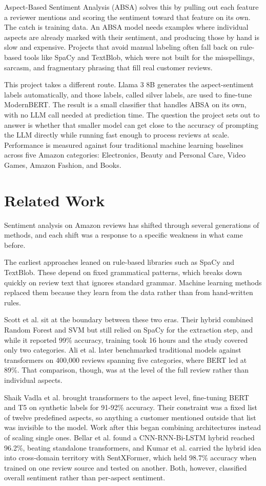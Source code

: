 \documentclass[sigconf]{acmart}
\begin{document}
Aspect-Based Sentiment Analysis (ABSA) solves this by pulling out each feature a reviewer mentions and scoring the sentiment toward that feature on its own. The catch is training data. An ABSA model needs examples where individual aspects are already marked with their sentiment, and producing those by hand is slow and expensive. Projects that avoid manual labeling often fall back on rule-based tools like SpaCy and TextBlob, which were not built for the misspellings, sarcasm, and fragmentary phrasing that fill real customer reviews.

This project takes a different route. Llama 3 8B generates the aspect-sentiment labels automatically, and those labels, called silver labels, are used to fine-tune ModernBERT. The result is a small classifier that handles ABSA on its own, with no LLM call needed at prediction time. The question the project sets out to answer is whether that smaller model can get close to the accuracy of prompting the LLM directly while running fast enough to process reviews at scale. Performance is measured against four traditional machine learning baselines across five Amazon categories: Electronics, Beauty and Personal Care, Video Games, Amazon Fashion, and Books.


\section{Related Work}
Sentiment analysis on Amazon reviews has shifted through several generations of methods, and each shift was a response to a specific weakness in what came before.

The earliest approaches leaned on rule-based libraries such as SpaCy and TextBlob. These depend on fixed grammatical patterns, which breaks down quickly on review text that ignores standard grammar. Machine learning methods replaced them because they learn from the data rather than from hand-written rules.

Scott et al. \cite{scott2025} sit at the boundary between these two eras. Their hybrid combined Random Forest and SVM but still relied on SpaCy for the extraction step, and while it reported 99\% accuracy, training took 16 hours and the study covered only two categories. Ali et al. \cite{ali2024} later benchmarked traditional models against transformers on 400,000 reviews spanning five categories, where BERT led at 89\%. That comparison, though, was at the level of the full review rather than individual aspects.

Shaik Vadla et al. \cite{vadla2024} brought transformers to the aspect level, fine-tuning BERT and T5 on synthetic labels for 91-92\% accuracy. Their constraint was a fixed list of twelve predefined aspects, so anything a customer mentioned outside that list was invisible to the model. Work after this began combining architectures instead of scaling single ones. Bellar et al. \cite{bellar2024} found a CNN-RNN-Bi-LSTM hybrid reached 96.2\%, beating standalone transformers, and Kumar et al. \cite{kumar2026} carried the hybrid idea into cross-domain territory with SentXFormer, which held 98.7\% accuracy when trained on one review source and tested on another. Both, however, classified overall sentiment rather than per-aspect sentiment.
\end{document}
